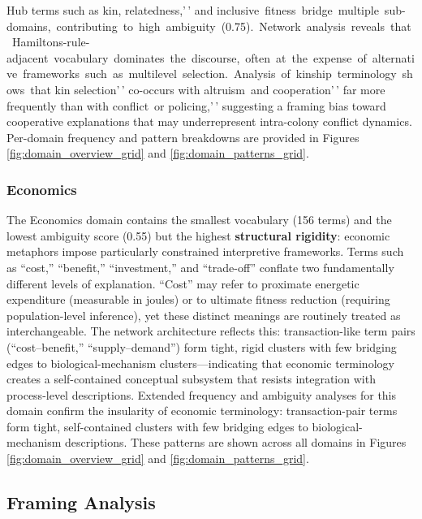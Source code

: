 \documentclass[
]{article}
\numberwithin{equation}{section}
\renewcommand{\texttt}[1]{%
    \colorbox{codebg}{\color{codefg}\ttfamily #1}%
}
\begin{document}
Hub terms such as
\texttt{kin,\textquotesingle{}\textquotesingle{}}relatedness,'\,' and
\texttt{inclusive\ fitness\textquotesingle{}\textquotesingle{}\ bridge\ multiple\ sub-domains,\ contributing\ to\ high\ ambiguity\ (0.75).\ Network\ analysis\ reveals\ that\ Hamilton\textquotesingle{}s-rule-adjacent\ vocabulary\ dominates\ the\ discourse,\ often\ at\ the\ expense\ of\ alternative\ frameworks\ such\ as\ multilevel\ selection.\ Analysis\ of\ kinship\ terminology\ shows\ that}kin
selection'\,' co-occurs with
\texttt{altruism\textquotesingle{}\textquotesingle{}\ and}cooperation'\,'
far more frequently than with
\texttt{conflict\textquotesingle{}\textquotesingle{}\ or}policing,'\,'
suggesting a framing bias toward cooperative explanations that may
underrepresent intra-colony conflict dynamics. Per-domain frequency and
pattern breakdowns are provided in Figures
\ref{fig:domain_overview_grid} and \ref{fig:domain_patterns_grid}.

\subsubsection{Economics}\label{economics}

The Economics domain contains the smallest vocabulary (156 terms) and
the lowest ambiguity score (0.55) but the highest \textbf{structural
rigidity}: economic metaphors impose particularly constrained
interpretive frameworks. Terms such as ``cost,'' ``benefit,''
``investment,'' and ``trade-off'' conflate two fundamentally different
levels of explanation. ``Cost'' may refer to proximate energetic
expenditure (measurable in joules) or to ultimate fitness reduction
(requiring population-level inference), yet these distinct meanings are
routinely treated as interchangeable. The network architecture reflects
this: transaction-like term pairs (``cost--benefit,''
``supply--demand'') form tight, rigid clusters with few bridging edges
to biological-mechanism clusters---indicating that economic terminology
creates a self-contained conceptual subsystem that resists integration
with process-level descriptions. Extended frequency and ambiguity
analyses for this domain confirm the insularity of economic terminology:
transaction-pair terms form tight, self-contained clusters with few
bridging edges to biological-mechanism descriptions. These patterns are
shown across all domains in Figures \ref{fig:domain_overview_grid} and
\ref{fig:domain_patterns_grid}.

\subsection{Framing Analysis}\label{framing-analysis}
\end{document}
